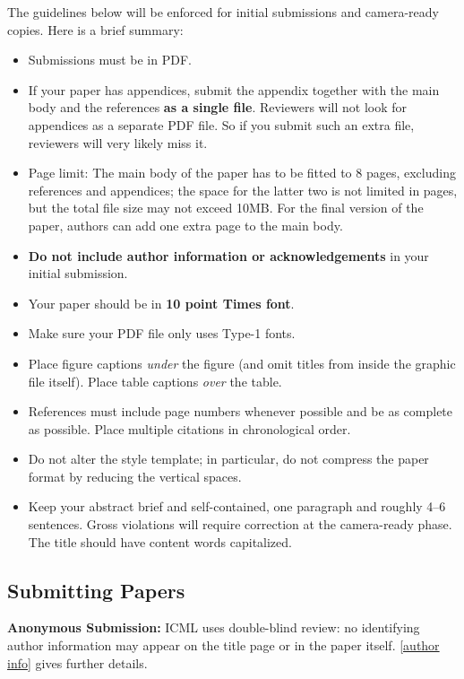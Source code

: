 \documentclass{article}
\theoremstyle{plain}
\theoremstyle{definition}
\theoremstyle{remark}
\begin{document}
The guidelines below will be enforced for initial submissions and
camera-ready copies. Here is a brief summary:
\begin{itemize}
  \item Submissions must be in PDF\@.
  \item If your paper has appendices, submit the appendix together with the
        main body and the references \textbf{as a single file}. Reviewers will not
        look for appendices as a separate PDF file. So if you submit such an extra
        file, reviewers will very likely miss it.
  \item Page limit: The main body of the paper has to be fitted to 8 pages,
        excluding references and appendices; the space for the latter two is not
        limited in pages, but the total file size may not exceed 10MB. For the
        final version of the paper, authors can add one extra page to the main
        body.
  \item \textbf{Do not include author information or acknowledgements} in your
        initial submission.
  \item Your paper should be in \textbf{10 point Times font}.
  \item Make sure your PDF file only uses Type-1 fonts.
  \item Place figure captions \emph{under} the figure (and omit titles from
        inside the graphic file itself). Place table captions \emph{over} the
        table.
  \item References must include page numbers whenever possible and be as
        complete as possible. Place multiple citations in chronological order.
  \item Do not alter the style template; in particular, do not compress the
        paper format by reducing the vertical spaces.
  \item Keep your abstract brief and self-contained, one paragraph and roughly
        4--6 sentences. Gross violations will require correction at the
        camera-ready phase. The title should have content words capitalized.
\end{itemize}

\subsection{Submitting Papers}

\textbf{Anonymous Submission:} ICML uses double-blind review: no identifying
author information may appear on the title page or in the paper
itself. \cref{author info} gives further details.
\end{document}
